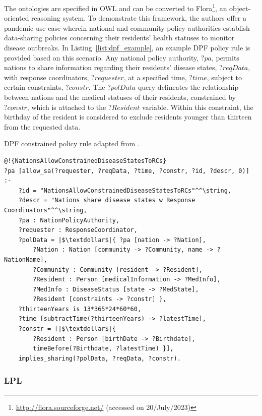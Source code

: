 The ontologies are specified in OWL and can be converted to Flora\footnote{\url{http://flora.sourceforge.net/} (accessed on 20/July/2023)}, an object-oriented reasoning system. 
To demonstrate this framework, the authors offer a pandemic use case wherein national and community policy authorities establish data-sharing policies concerning their residents' health statuses to monitor disease outbreaks. 
In Listing~\ref{list:dpf_example}, an example DPF policy rule is provided based on this scenario.
Any national policy authority, $?pa$, permits nations to share information regarding their residents' disease states, $?reqData$, with response coordinators, $?requester$, at a specified time, $?time$, subject to certain constraints, $?constr$. 
The $?polData$ query delineates the relationship between nations and the medical statuses of their residents, constrained by $?constr$, which is attached to the $?Resident$ variable.
Within this constraint, the birthday of the resident is considered to exclude residents younger than thirteen from the requested data.

\begin{listing}[ht]
\caption[DPF policy.]{DPF constrained policy rule adapted from \cite{martiny_protecting_2018}.}
\label{list:dpf_example}
\begin{verbatim}
@!{NationsAllowConstrainedDiseaseStatesToRCs}
?pa [allow_sa(?requester, ?reqData, ?time, ?constr, ?id, ?descr, 0)] :-
    ?id = "NationsAllowConstrainedDiseaseStatesToRCs"^^\string,
    ?descr = "Nations share disease states w Response Coordinators"^^\string,
    ?pa : NationPolicyAuthority,
    ?requester : ResponseCoordinator,
    ?polData = |$\textdollar$|{ ?pa [nation -> ?Nation],
        ?Nation : Nation [community -> ?Community, name -> ?NationName],
        ?Community : Community [resident -> ?Resident],
        ?Resident : Person [medicalInformation -> ?MedInfo],
        ?MedInfo : DiseaseStatus [state -> ?MedState],
        ?Resident [constraints -> ?constr] },
    ?thirteenYears is 13*365*24*60*60, 
    ?time [subtractTime(?thirteenYears) -> ?latestTime],
    ?constr = [|$\textdollar$|{ 
        ?Resident : Person [birthDate -> ?Birthdate],
        timeBefore(?Birthdate, ?latestTime) }],
    implies_sharing(?polData, ?reqData, ?constr).
\end{verbatim}
\end{listing}

\subsubsection{LPL}
\label{sec:lpl}


